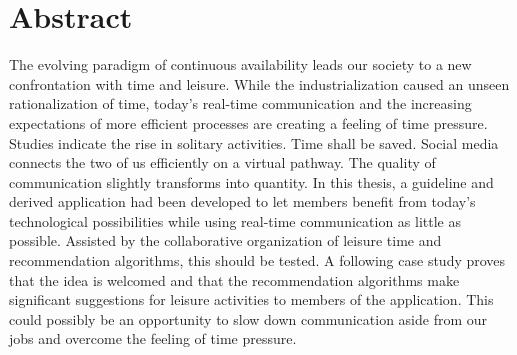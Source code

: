\documentclass[12pt,numbers=noenddot,parskip,bibliography=totocnumbered,listof=totocnumbered,draft]{scrreprt}
\begin{document}
\chapter*{Abstract}
The evolving paradigm of continuous availability leads our society to a new confrontation with time and leisure. While the industrialization caused an unseen rationalization of time, today's real-time communication and the increasing expectations of more efficient processes are creating a feeling of time pressure. Studies indicate the rise in solitary activities. Time shall be saved. Social media connects the two of us efficiently on a virtual pathway. The quality of communication slightly transforms into quantity. In this thesis, a guideline and derived application had been developed to let members benefit from today's technological possibilities while using real-time communication as little as possible. Assisted by the collaborative organization of leisure time and recommendation algorithms, this should be tested. A following case study proves that the idea is welcomed and that the recommendation algorithms make significant suggestions for leisure activities to members of the application. This could possibly be an opportunity to slow down communication aside from our jobs and overcome the feeling of time pressure.
\end{document}
